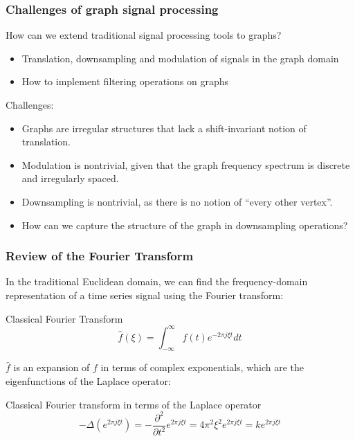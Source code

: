 \documentclass{beamer}
\begin{document}
\begin{frame}
  \frametitle{Challenges of graph signal processing}
  How can we extend traditional signal processing tools to graphs?
  \begin{itemize}
    \item Translation, downsampling and modulation of signals in the graph
      domain
    \item How to implement filtering operations on graphs
  \end{itemize}

  Challenges:
  \begin{itemize}
  \item Graphs are irregular structures that lack a shift-invariant notion of translation.
  \item Modulation is nontrivial, given that the graph frequency spectrum is
    discrete and irregularly spaced.
  \item Downsampling is nontrivial, as there is no notion of ``every other
    vertex''.
  \item How can we capture the structure of the graph in downsampling operations?
  \end{itemize}
\end{frame}


\begin{frame}
\frametitle{Review of the Fourier Transform}

In the traditional Euclidean domain, we can find the frequency-domain
representation of a time series signal using the Fourier transform:

\begin{block}{Classical Fourier Transform}
  \begin{equation}
    \hat{f}(\xi) = \int_{-\infty}^{\infty} f(t) e^{-2 \pi j \xi t} dt 
  \end{equation}
\end{block}

$\hat{f}$ is an expansion of $f$ in terms of complex exponentials, which are the
eigenfunctions of the Laplace operator:

\begin{block}{Classical Fourier transform in terms of the Laplace operator}
  \begin{equation}
    - \Delta (e^{2 \pi j \xi t}) = - \frac{\partial^2}{\partial t^2} e^{2 \pi j \xi t} = 4 \pi^2 \xi^2 e^{2 \pi j \xi t} = k e^{2 \pi j \xi t}
  \end{equation}
\end{block}
\end{frame}
\end{document}
